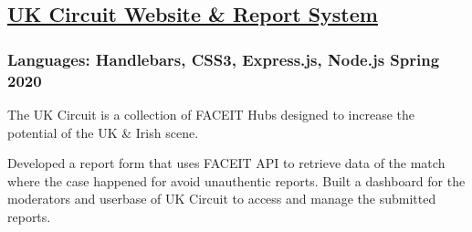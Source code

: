 \subsection*{
	\href{https://www.ukcircuit.co.uk/}{UK Circuit Website \& Report System}
}
\subsubsection*{
	Languages: Handlebars, CSS3, Express.js, Node.js
	\hspace*{\fill}
	Spring 2020
}
The UK Circuit is a collection of FACEIT Hubs designed to increase the potential of
the UK \& Irish scene.
\begin{tasks}
	\task Developed a report form that uses FACEIT API to retrieve data of the match where the
	case happened for avoid unauthentic reports.
	\task Built a dashboard for the moderators and userbase of UK Circuit to access and manage
	the submitted reports.
\end{tasks}